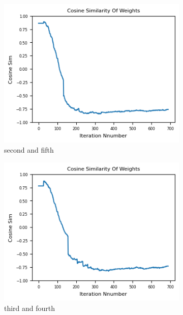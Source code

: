 \documentclass[12pt]{article}
\begin{document}
\begin{figure}[H]
  \begin{subfigure}[b]{0.3\textwidth}
    \includegraphics[width=\textwidth]{Figs/1-4.png}
    \caption{second and fifth}
  \end{subfigure}
  \hspace*{10}
  \begin{subfigure}[b]{0.3\textwidth}
    \includegraphics[width=\textwidth]{Figs/2-3.png}
    \caption{third and fourth}
  \end{subfigure}
  \hspace*{10}
  \begin{subfigure}[b]{0.3\textwidth}

\end{subfigure}
\end{figure}
\end{document}
